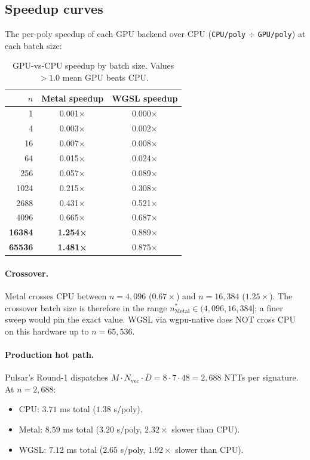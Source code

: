 \subsection{Speedup curves}

The per-poly speedup of each GPU backend over CPU
(\texttt{CPU/poly} $\div$ \texttt{GPU/poly}) at each batch size:

\begin{table}[H]
\centering
\caption{GPU-vs-CPU speedup by batch size. Values $> 1.0$ mean GPU
beats CPU.}
\label{tab:speedup}
\small
\begin{tabular}{rcc}
\toprule
$n$ & Metal speedup & WGSL speedup \\
\midrule
1     & 0.001× & 0.000× \\
4     & 0.003× & 0.002× \\
16    & 0.007× & 0.008× \\
64    & 0.015× & 0.024× \\
256   & 0.057× & 0.089× \\
1024  & 0.215× & 0.308× \\
2688  & 0.431× & 0.521× \\
4096  & 0.665× & 0.687× \\
\textbf{16384} & \textbf{1.254×} & 0.889× \\
\textbf{65536} & \textbf{1.481×} & 0.875× \\
\bottomrule
\end{tabular}
\end{table}

\paragraph{Crossover.}
Metal crosses CPU between $n = 4{,}096$ ($0.67\times$) and $n = 16{,}384$
($1.25\times$). The crossover batch size is therefore in the range
$n^*_{\text{Metal}} \in (4{,}096, 16{,}384]$; a finer sweep would
pin the exact value. WGSL via wgpu-native does NOT cross CPU on this
hardware up to $n = 65{,}536$.

\paragraph{Production hot path.}
Pulsar's Round-1 dispatches $M \cdot N_\text{vec} \cdot \bar{D}
= 8 \cdot 7 \cdot 48 = 2{,}688$ NTTs per signature. At
$n = 2{,}688$:
\begin{itemize}[nosep]
\item CPU: $3.71$ ms total ($1.38$ \textmu s/poly).
\item Metal: $8.59$ ms total ($3.20$ \textmu s/poly, $2.32\times$ slower than CPU).
\item WGSL: $7.12$ ms total ($2.65$ \textmu s/poly, $1.92\times$ slower than CPU).
\end{itemize}

